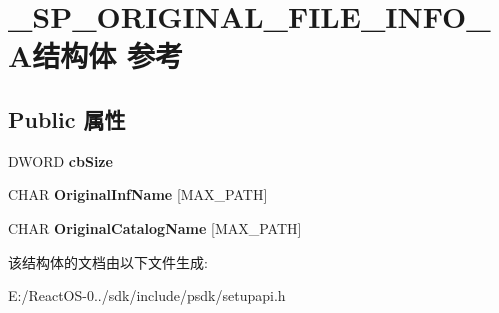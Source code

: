 \hypertarget{struct___s_p___o_r_i_g_i_n_a_l___f_i_l_e___i_n_f_o___a}{}\section{\+\_\+\+S\+P\+\_\+\+O\+R\+I\+G\+I\+N\+A\+L\+\_\+\+F\+I\+L\+E\+\_\+\+I\+N\+F\+O\+\_\+\+A结构体 参考}
\label{struct___s_p___o_r_i_g_i_n_a_l___f_i_l_e___i_n_f_o___a}
\subsection*{Public 属性}
\begin{DoxyCompactItemize}
\item 
\mbox{\label{struct___s_p___o_r_i_g_i_n_a_l___f_i_l_e___i_n_f_o___a_afdce4049db1cccbd34138aafb13371ff}} 
D\+W\+O\+RD {\bfseries cb\+Size}
\item 
\mbox{\label{struct___s_p___o_r_i_g_i_n_a_l___f_i_l_e___i_n_f_o___a_ae16b76d59948ef43b65c52cb471f807a}} 
C\+H\+AR {\bfseries Original\+Inf\+Name} \mbox{[}M\+A\+X\+\_\+\+P\+A\+TH\mbox{]}
\item 
\mbox{\label{struct___s_p___o_r_i_g_i_n_a_l___f_i_l_e___i_n_f_o___a_a8c3a8b51b31f44dd7c9f71db5b7cd6ee}} 
C\+H\+AR {\bfseries Original\+Catalog\+Name} \mbox{[}M\+A\+X\+\_\+\+P\+A\+TH\mbox{]}
\end{DoxyCompactItemize}


该结构体的文档由以下文件生成\+:\begin{DoxyCompactItemize}
\item 
E\+:/\+React\+O\+S-\/0../sdk/include/psdk/setupapi.\+h\end{DoxyCompactItemize}
